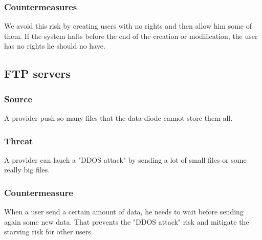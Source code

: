 \documentclass[a4paper,11pt]{article}
\begin{document}
\subsubsection{Countermeasures}
We avoid this risk by creating users with no rights and then allow him some of them. If the system halts before the end of the creation or modification, the user has no rights he should no have.  
\subsection{FTP servers}
\subsubsection{Source}
A provider push so many files that the data-diode cannot store them all.
\subsubsection{Threat}
A provider can lauch a "DDOS attack" by sending a lot of small files or some really big files.
\subsubsection{Countermeasure}
When a user send a certain amount of data, he needs to wait before sending again some new data. That prevents the "DDOS attack" risk and mitigate the starving risk for other users.
\end{document}

